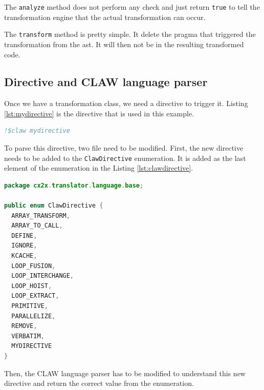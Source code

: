 \documentclass[a4paper, 11pt]{report}
\begin{document}
The \lstinline|analyze| method does not perform any check and just return
\lstinline|true| to tell the transformation engine that the actual
transformation can occur.

The \lstinline|transform| method is pretty simple. It delete the pragma that
triggered the transformation from the \gls{ast}. It will then not be in the
resulting transformed code.

\subsection{Directive and CLAW language parser}
Once we have a transformation class, we need a directive to trigger it. Listing
\ref{lst:mydirective} is the directive that is used in this example.

\begin{lstlisting}[label=lst:mydirective, caption=Example directive, language=fortran]
!$claw mydirective
\end{lstlisting}

To parse this directive, two file need to be modified. First, the new directive
needs to be added to the \lstinline|ClawDirective| enumeration. It is added as
the last element of the enumeration in the Listing \ref{lst:clawdirective}.

\begin{lstlisting}[label=lst:clawdirective, caption=ClawDirective.java, language=java]
package cx2x.translator.language.base;

public enum ClawDirective {
  ARRAY_TRANSFORM,
  ARRAY_TO_CALL,
  DEFINE,
  IGNORE,
  KCACHE,
  LOOP_FUSION,
  LOOP_INTERCHANGE,
  LOOP_HOIST,
  LOOP_EXTRACT,
  PRIMITIVE,
  PARALLELIZE,
  REMOVE,
  VERBATIM,
  MYDIRECTIVE
}
\end{lstlisting}

Then, the CLAW language parser has to be modified to understand this new
directive and return the correct value from the enumeration.
\end{document}
